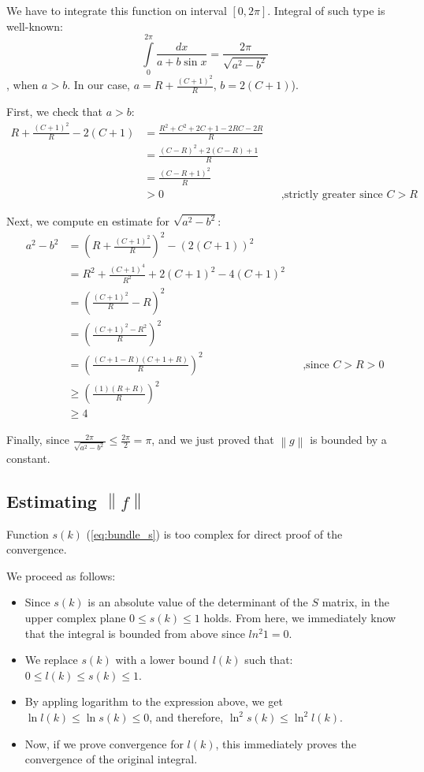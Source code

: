\documentclass{gCOV2e}
\theoremstyle{plain}%
\theoremstyle{definition}
\theoremstyle{remark}
\newcommand\norm[1]{\left\|#1\right\|}
\begin{document}
We have to integrate this function on interval $[0, 2 \pi]$. Integral of such type is well-known: %
\[
\int\limits_{0}^{2 \pi} \frac{dx}{a + b \sin x} = \frac{2 \pi}{\sqrt{a^2 - b^2}}
\]
, when $a > b$. In our case, $a = R + \frac{(C + 1)^2}{R}$, $b = 2 (C + 1)$).

First, we check that $a > b$:
\begin{align*}
   R + \frac{(C + 1)^2}{R} - 2 (C + 1)
   &= \frac{R^2 + C^2 + 2C + 1 - 2 RC - 2 R}{R}
\\ &= \frac{(C - R)^2 + 2(C - R) + 1}{R}
\\ &= \frac{(C - R + 1)^2 }{R}
\\ &> 0 && \text{,strictly greater since $C > R$} 
\end{align*}

Next, we compute en estimate for $\sqrt{a^2 - b^2}$:
\begin{align*}
a^2 - b^2
& =  (R + \frac{(C + 1)^2}{R})^2 - (2 (C + 1))^2\\
& =  R^2 + \frac{(C+1)^4}{R^2} + 2 (C+1)^2 - 4 (C + 1)^2 \\
& =  \left( \frac{(C + 1)^2}{R} - R \right)^2 \\
& =  \left( \frac{(C + 1)^2 - R^2}{R}\right)^2 \\
& =  \left( \frac{(C + 1 - R) (C + 1 + R)}{R}\right)^2 && \text{,since $C > R > 0$} \\
&\ge \left( \frac{(1) (R + R)}{R}\right)^2  \\
&\ge 4
\end{align*}

Finally, since $\frac{2 \pi}{\sqrt{a^2 - b^2}} \le \frac{2 \pi}{2} = \pi$, and we just proved that $\norm{g}$ is bounded by a constant. 


\subsection{Estimating $\norm{f}$}
Function $s(k)$ (\ref{eq:bundle_s}) is too complex for direct proof of the convergence.

We proceed as follows:

\begin{itemize}
\item Since $s(k)$ is an absolute value of the determinant of the $S$ matrix, in the upper complex plane $0 \le s(k) \le 1$ holds. From here, we immediately know that the integral is bounded from above since $ln^2 1 = 0$.
\item We replace $s(k)$ with a lower bound $l(k)$ such that: $0 \le l(k) \le s(k) \le 1$.
\item By appling logarithm to the expression above, we get $\ln l(k) \le \ln s(k) \le 0$, and therefore, $\ln^2 s(k) \le \ln^2 l(k)$.
\item Now, if we prove convergence for $l(k)$, this immediately proves the convergence of the original integral.
\end{itemize}
\end{document}
